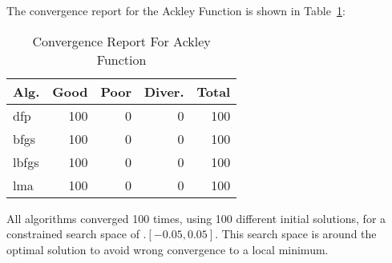 
The convergence report for the Ackley Function is shown in Table~\ref{convergence:ackley}:

\begin{table}[H]
\centering
\caption{Convergence Report For Ackley Function}
\label{convergence:ackley}
\begin{tabular}{lrrrr}
\toprule
 Alg. &  Good &  Poor &  Diver. &  Total \\
\midrule
  dfp &   100 &     0 &       0 &    100 \\
 bfgs &   100 &     0 &       0 &    100 \\
lbfgs &   100 &     0 &       0 &    100 \\
  lma &   100 &     0 &       0 &    100 \\
\bottomrule
\end{tabular}
\end{table}

All algorithms converged 100 times, using 100 different initial solutions,
for a constrained search space of .$[-0.05, 0.05]$. This search space is around
the optimal solution to avoid wrong convergence to a local minimum.


